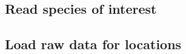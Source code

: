 \documentclass[]{article}
\newenvironment{Shaded}{\begin{snugshade}}{\end{snugshade}}
\newcommand{\CommentTok}[1]{\textcolor[rgb]{0.56,0.35,0.01}{\textit{#1}}}
\newcommand{\KeywordTok}[1]{\textcolor[rgb]{0.13,0.29,0.53}{\textbf{#1}}}
\newcommand{\NormalTok}[1]{#1}
\newcommand{\OperatorTok}[1]{\textcolor[rgb]{0.81,0.36,0.00}{\textbf{#1}}}
\newcommand{\StringTok}[1]{\textcolor[rgb]{0.31,0.60,0.02}{#1}}
\begin{document}
\hypertarget{read-species-of-interest}{%
\subsection{Read species of interest}\label{read-species-of-interest}}

\begin{Shaded}
\end{Shaded}

\hypertarget{load-raw-data-for-locations}{%
\subsection{Load raw data for locations}\label{load-raw-data-for-locations}}
\end{document}
